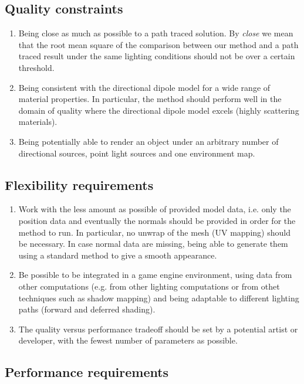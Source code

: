 \subsection{Quality constraints}
 \label{sec:quality}
\begin{enumerate}
	\item Being close as much as possible to a path traced solution. By \emph{close} we mean that the root mean square of the comparison between our method and a path traced result under the same lighting conditions should not be over a certain threshold. 
	\item Being consistent with the directional dipole model for a wide range of material properties. In particular, the method should perform well in the domain of quality where the directional dipole model excels (highly scattering materials).
	\item Being potentially able to render an object under an arbitrary number of directional sources, point light sources and one environment map.
\end{enumerate}

\subsection{Flexibility requirements}	
\begin{enumerate}
	\item Work with the less amount as possible of provided model data, i.e. only the position data and eventually the normals should be provided in order for the method to run. In particular, no unwrap of the mesh (UV mapping) should be necessary. In case normal data are missing,  being able to generate them using a standard method to give a smooth appearance.
	\item Be possible to be integrated in a game engine environment, using data from other computations (e.g. from other lighting computations or from othet techniques such as shadow mapping) and being adaptable to different lighting paths (forward and deferred shading).
  \item The quality versus performance tradeoff should be set by a potential artist or developer, with the fewest number of parameters as possible.
\end{enumerate}

\subsection{Performance requirements}

